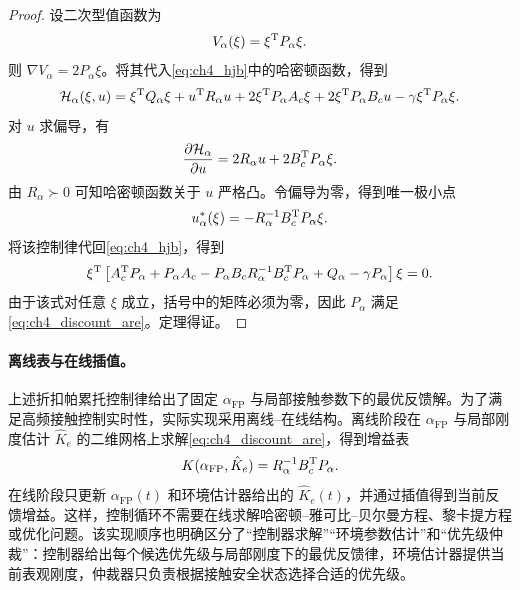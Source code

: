 \begin{proof}
设二次型值函数为
\begin{equation}
  V_\alpha(\xi)=\xi^{\mathrm{T}}P_\alpha\xi .
\end{equation}
则 $\nabla V_\alpha=2P_\alpha\xi$。将其代入\eqref{eq:ch4_hjb}中的哈密顿函数，得到
\begin{equation}
  \mathcal{H}_\alpha(\xi,u)=\xi^{\mathrm{T}}Q_\alpha\xi+u^{\mathrm{T}}R_\alpha u+2\xi^{\mathrm{T}}P_\alpha A_c\xi+2\xi^{\mathrm{T}}P_\alpha B_cu-\gamma\xi^{\mathrm{T}}P_\alpha\xi .
\end{equation}
对 $u$ 求偏导，有
\begin{equation}
  \frac{\partial\mathcal{H}_\alpha}{\partial u}=2R_\alpha u+2B_c^{\mathrm{T}}P_\alpha\xi .
\end{equation}
由 $R_\alpha\succ0$ 可知哈密顿函数关于 $u$ 严格凸。令偏导为零，得到唯一极小点
\begin{equation}
  u_\alpha^*(\xi)=-R_\alpha^{-1}B_c^{\mathrm{T}}P_\alpha\xi .
\end{equation}
将该控制律代回\eqref{eq:ch4_hjb}，得到
\begin{equation}
  \xi^{\mathrm{T}}\left[A_c^{\mathrm{T}}P_\alpha+P_\alpha A_c-P_\alpha B_cR_\alpha^{-1}B_c^{\mathrm{T}}P_\alpha+Q_\alpha-\gamma P_\alpha\right]\xi=0 .
\end{equation}
由于该式对任意 $\xi$ 成立，括号中的矩阵必须为零，因此 $P_\alpha$ 满足\eqref{eq:ch4_discount_are}。定理得证。
\end{proof}

\paragraph{离线表与在线插值。}
\label{subsec:ch4_offline_online}

上述折扣帕累托控制律给出了固定 $\alpha_{\mathrm{FP}}$ 与局部接触参数下的最优反馈解。为了满足高频接触控制实时性，实际实现采用离线--在线结构。离线阶段在 $\alpha_{\mathrm{FP}}$ 与局部刚度估计 $\hat K_e$ 的二维网格上求解\eqref{eq:ch4_discount_are}，得到增益表
\begin{equation}
  K(\alpha_{\mathrm{FP}},\hat K_e)=R_\alpha^{-1}B_c^{\mathrm{T}}P_\alpha .
  \label{eq:ch4_gain_table}
\end{equation}
在线阶段只更新 $\alpha_{\mathrm{FP}}(t)$ 和环境估计器给出的 $\hat K_e(t)$，并通过插值得到当前反馈增益。这样，控制循环不需要在线求解哈密顿--雅可比--贝尔曼方程、黎卡提方程或优化问题。该实现顺序也明确区分了“控制器求解”“环境参数估计”和“优先级仲裁”：控制器给出每个候选优先级与局部刚度下的最优反馈律，环境估计器提供当前表观刚度，仲裁器只负责根据接触安全状态选择合适的优先级。


